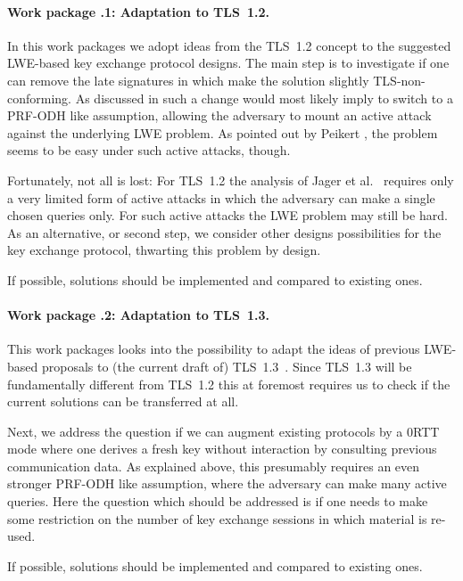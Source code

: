 \label{mf:wp:zwei}

\paragraph{Work package \theworkpackage.1: Adaptation to TLS~1.2.}

In this work packages we adopt ideas from the TLS~1.2 concept \cite{TLS12} to the suggested LWE-based key exchange protocol designs. The main step is to investigate if one can remove the late signatures in \cite{BCNS15} which make the solution slightly TLS-non-conforming. As discussed in \cite{BCNS15} such a change would most likely imply to switch to a PRF-ODH like assumption, allowing the adversary to mount an active attack against the underlying LWE problem. As pointed out by Peikert \cite{P14}, the problem seems to be easy under such active attacks, though. 

Fortunately, not all is lost: For TLS~1.2 the analysis of Jager et al.~\cite{JKSS12} requires only a very limited form of active attacks in which the adversary can make a single chosen queries only. For such active attacks the LWE problem may still be hard. As an alternative, or second step, we consider other designs possibilities for the key exchange protocol, thwarting this problem by design.

If possible, solutions should be implemented and compared to existing ones.

\paragraph{Work package \theworkpackage.2: Adaptation to TLS~1.3.}

This work packages looks into the possibility to adapt the ideas of previous LWE-based proposals to (the current draft of) TLS~1.3~\cite{TLS13}. Since TLS~1.3 will be fundamentally different from TLS~1.2 this at foremost requires us to check if the current solutions can be transferred at all. 

Next, we address the question if we can augment existing protocols by a 0RTT mode where one derives a fresh key without interaction by consulting previous communication data. As explained above, this presumably requires an even stronger PRF-ODH like assumption, where the adversary can make many active queries. Here the question which should be addressed is if one needs to make some restriction on the number of key exchange sessions in which material is re-used.

If possible, solutions should be implemented and compared to existing ones.



